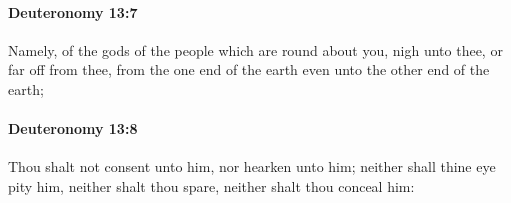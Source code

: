 		\paragraph{Deuteronomy 13:7} %
			\label{DEUTERONOMY-13-7}

			Namely, of the gods of the people which are round about you, nigh unto thee, or far off from thee, from the one end of the earth even unto the other end of the earth;


		\paragraph{Deuteronomy 13:8} %
			\label{DEUTERONOMY-13-8}

			Thou shalt not consent unto him, nor hearken unto him; neither shall thine eye pity him, neither shalt thou spare, neither shalt thou conceal him:


